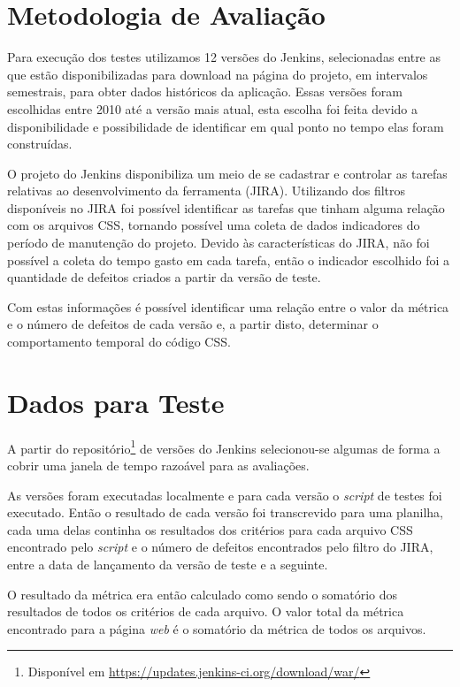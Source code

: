 \section{Metodologia de Avaliação}

Para execução dos testes utilizamos 12 versões do Jenkins, selecionadas entre as que estão disponibilizadas para download na página do projeto, em intervalos semestrais, para obter dados históricos da aplicação. Essas versões foram escolhidas entre 2010 até a versão mais atual, esta escolha foi feita devido a disponibilidade e possibilidade de identificar em qual ponto no tempo elas foram construídas.

O projeto do Jenkins disponibiliza um meio de se cadastrar e controlar as tarefas relativas ao desenvolvimento da ferramenta (JIRA\footnotemark). Utilizando dos filtros disponíveis no JIRA foi possível identificar as tarefas que tinham alguma relação com os arquivos CSS, tornando possível uma coleta de dados indicadores do período de manutenção do projeto. Devido às características do JIRA, não foi possível a coleta do tempo gasto em cada tarefa, então o indicador escolhido foi a quantidade de defeitos criados a partir da versão de teste.

Com estas informações é possível identificar uma relação entre o valor da métrica e o número de defeitos de cada versão e, a partir disto, determinar o comportamento temporal do código CSS.


\section{Dados para Teste}

A partir do repositório\footnote{Disponível em \url{https://updates.jenkins-ci.org/download/war/}} de versões do Jenkins selecionou-se algumas de forma a cobrir uma janela de tempo razoável para as avaliações.



As versões foram executadas localmente e para cada versão o \textit{script} de testes foi executado. Então o resultado de cada versão foi transcrevido para uma planilha, cada uma delas continha os resultados dos critérios para cada arquivo CSS encontrado pelo \textit{script} e o número de defeitos encontrados pelo filtro do JIRA, entre a data de lançamento da versão de teste e a seguinte.

O resultado da métrica era então calculado como sendo o somatório dos resultados de todos os critérios de cada arquivo. O valor total da métrica encontrado para a página \textit{web} é o somatório da métrica de todos os arquivos.

